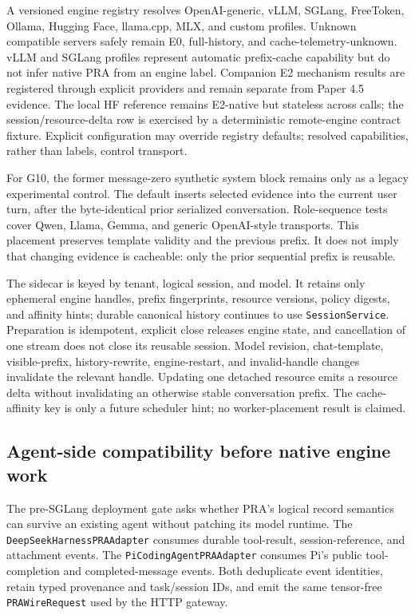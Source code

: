 \documentclass[11pt]{article}
\begin{document}
A versioned engine registry resolves OpenAI-generic, vLLM, SGLang, FreeToken,
Ollama, Hugging Face, llama.cpp, MLX, and custom profiles. Unknown compatible
servers safely remain E0, full-history, and cache-telemetry-unknown. vLLM and
SGLang profiles represent automatic prefix-cache capability but do not infer
native PRA from an engine label. Companion E2 mechanism results are registered
through explicit providers and remain separate from Paper 4.5 evidence. The
local HF reference remains E2-native but
stateless across calls; the session/resource-delta row is exercised by a
deterministic remote-engine contract fixture. Explicit configuration may
override registry defaults; resolved capabilities, rather than labels, control
transport.

For G10, the former message-zero synthetic system block remains only as a
legacy experimental control. The default inserts selected evidence into the
current user turn, after the byte-identical prior serialized conversation.
Role-sequence tests cover Qwen, Llama, Gemma, and generic OpenAI-style
transports. This placement preserves template validity and the previous
prefix. It does not imply that changing evidence is cacheable: only the prior
sequential prefix is reusable.

The sidecar is keyed by tenant, logical session, and model. It retains only
ephemeral engine handles, prefix fingerprints, resource versions, policy
digests, and affinity hints; durable canonical history continues to use
\texttt{SessionService}. Preparation is idempotent, explicit close releases
engine state, and cancellation of one stream does not close its reusable
session. Model revision, chat-template, visible-prefix, history-rewrite,
engine-restart, and invalid-handle changes invalidate the relevant handle.
Updating one detached resource emits a resource delta without invalidating an
otherwise stable conversation prefix. The cache-affinity key is only a future
scheduler hint; no worker-placement result is claimed.

\subsection{Agent-side compatibility before native engine work}

The pre-SGLang deployment gate asks whether PRA's logical record semantics can
survive an existing agent without patching its model runtime. The
\texttt{DeepSeekHarnessPRAAdapter} consumes durable tool-result, session-reference,
and attachment events. The \texttt{PiCodingAgentPRAAdapter} consumes Pi's public
tool-completion and completed-message events. Both deduplicate event identities,
retain typed provenance and task/session IDs, and emit the same tensor-free
\texttt{PRAWireRequest} used by the HTTP gateway.
\end{document}
